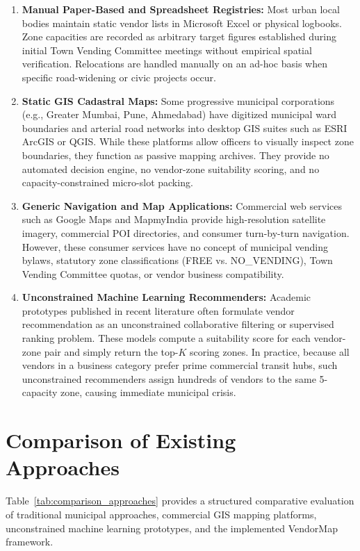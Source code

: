 \begin{enumerate}
    \item \textbf{Manual Paper-Based and Spreadsheet Registries:} Most urban local bodies maintain static vendor lists in Microsoft Excel or physical logbooks. Zone capacities are recorded as arbitrary target figures established during initial Town Vending Committee meetings without empirical spatial verification. Relocations are handled manually on an ad-hoc basis when specific road-widening or civic projects occur.
    \item \textbf{Static GIS Cadastral Maps:} Some progressive municipal corporations (e.g., Greater Mumbai, Pune, Ahmedabad) have digitized municipal ward boundaries and arterial road networks into desktop GIS suites such as ESRI ArcGIS or QGIS. While these platforms allow officers to visually inspect zone boundaries, they function as passive mapping archives. They provide no automated decision engine, no vendor-zone suitability scoring, and no capacity-constrained micro-slot packing.
    \item \textbf{Generic Navigation and Map Applications:} Commercial web services such as Google Maps and MapmyIndia provide high-resolution satellite imagery, commercial POI directories, and consumer turn-by-turn navigation. However, these consumer services have no concept of municipal vending bylaws, statutory zone classifications (FREE vs. NO\_VENDING), Town Vending Committee quotas, or vendor business compatibility.
    \item \textbf{Unconstrained Machine Learning Recommenders:} Academic prototypes published in recent literature often formulate vendor recommendation as an unconstrained collaborative filtering or supervised ranking problem. These models compute a suitability score for each vendor-zone pair and simply return the top-$K$ scoring zones. In practice, because all vendors in a business category prefer prime commercial transit hubs, such unconstrained recommenders assign hundreds of vendors to the same 5-capacity zone, causing immediate municipal crisis.
\end{enumerate}

\section{Comparison of Existing Approaches}
\label{sec:comparison_approaches}

Table~\ref{tab:comparison_approaches} provides a structured comparative evaluation of traditional municipal approaches, commercial GIS mapping platforms, unconstrained machine learning prototypes, and the implemented VendorMap framework.

